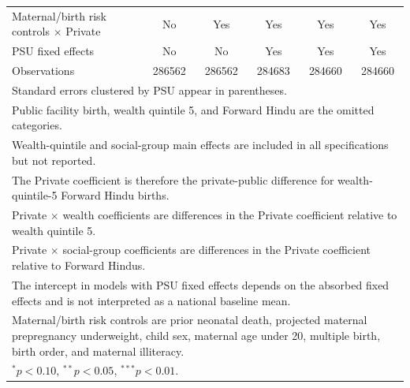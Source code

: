 {\begin{tabular}{l*{5}{c}}
Maternal/birth risk controls $\times$ Private&          No         &         Yes         &         Yes         &         Yes         &         Yes         \\
PSU fixed effects&          No         &          No         &         Yes         &         Yes         &         Yes         \\
Observations&      286562         &      286562         &      284683         &      284660         &      284660         \\
\bottomrule
\multicolumn{6}{l}{\footnotesize Standard errors clustered by PSU appear in parentheses.}\\
\multicolumn{6}{l}{\footnotesize Public facility birth, wealth quintile 5, and Forward Hindu are the omitted categories.}\\
\multicolumn{6}{l}{\footnotesize Wealth-quintile and social-group main effects are included in all specifications but not reported.}\\
\multicolumn{6}{l}{\footnotesize The Private coefficient is therefore the private-public difference for wealth-quintile-5 Forward Hindu births.}\\
\multicolumn{6}{l}{\footnotesize Private $\times$ wealth coefficients are differences in the Private coefficient relative to wealth quintile 5.}\\
\multicolumn{6}{l}{\footnotesize Private $\times$ social-group coefficients are differences in the Private coefficient relative to Forward Hindus.}\\
\multicolumn{6}{l}{\footnotesize The intercept in models with PSU fixed effects depends on the absorbed fixed effects and is not interpreted as a national baseline mean.}\\
\multicolumn{6}{l}{\footnotesize Maternal/birth risk controls are prior neonatal death, projected maternal prepregnancy underweight, child sex, maternal age under 20, multiple birth, birth order, and maternal illiteracy.}\\
\multicolumn{6}{l}{\footnotesize $^{*}p<0.10$, $^{**}p<0.05$, $^{***}p<0.01$.}\\
\end{tabular}
}
